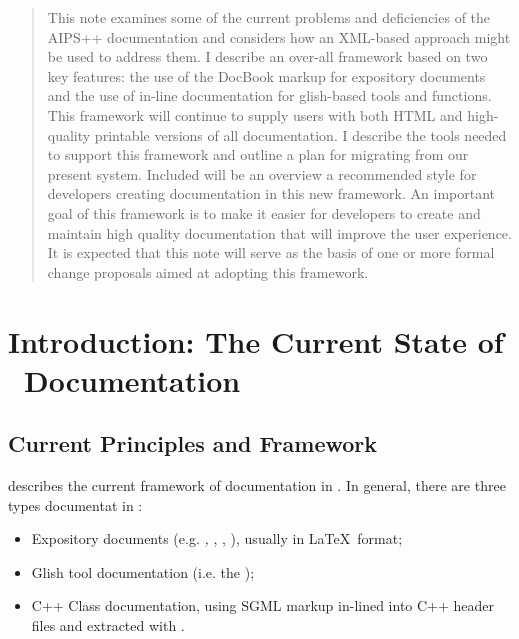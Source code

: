 \newcommand{\refman}{{\it Reference Manual}}

\begin{abstract}
This note examines some of the current problems and deficiencies of
the AIPS++ documentation and considers how an XML-based approach might
be used to address them.  I describe an over-all framework based on
two key features:  the use of the DocBook markup for expository
documents and the use of in-line documentation for glish-based tools
and functions.  This framework will continue to supply users
with both HTML and high-quality printable versions of all
documentation.  I describe the tools needed to support this framework
and outline a plan for migrating from our present system.  Included
will be an overview a recommended style for developers creating
documentation in this new framework.  An important goal of this
framework is to make it easier for developers to create and maintain
high quality documentation that will improve the user experience.  It
is expected that this note will serve as the basis of one or more
formal change proposals aimed at adopting this framework.
\end{abstract}

\tableofcontents

\section{Introduction:  The Current State of \aipspp\ Documentation}

\subsection{Current Principles and Framework}

 describes the
current framework of documentation in \aipspp.  In general, there are
three types documentat in \aipspp:

\begin{itemize}
\item Expository documents (e.g. {\it 
{},
},
, 
), usually in \LaTeX\ 
format;

\item Glish tool documentation (i.e. the {\it
{}});

\item C++ Class documentation, using SGML markup in-lined into C++
header files and extracted with 
.

\end{itemize}

